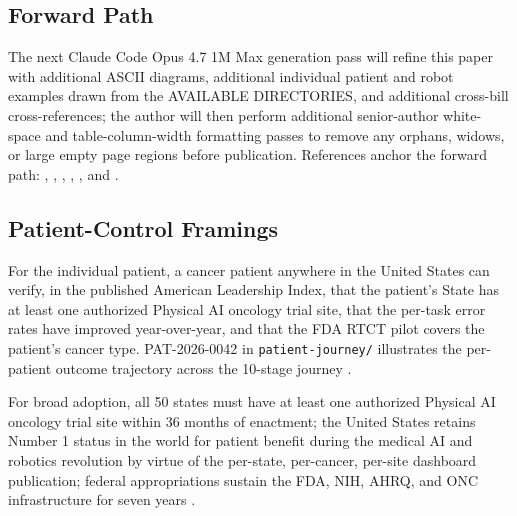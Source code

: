 \subsection{Forward Path}

\hspace{0.5cm} The next Claude Code Opus 4.7 1M Max generation pass will refine
this paper with additional ASCII diagrams, additional individual
patient and robot examples drawn from the AVAILABLE DIRECTORIES, and
additional cross-bill cross-references; the author will then
perform additional senior-author white-space and table-column-width
formatting passes to remove any orphans, widows, or large empty
page regions before publication. References anchor the forward
path: \cite{kawchak_2026_20045457}, \cite{fda_rtct_press_2026},
\cite{kawchak_2026_19994945}, \cite{kawchak_2026_19396256},
\cite{kawchak_2026_19244918}, and \cite{kawchak_2026_18810541}.

\subsection{Patient-Control Framings}

\hspace{0.5cm} For the individual patient, a cancer patient anywhere in the
United States can verify, in the published American Leadership
Index, that the patient's State has at least one authorized
Physical AI oncology trial site, that the per-task error rates have
improved year-over-year, and that the FDA RTCT pilot covers the
patient's cancer type. PAT-2026-0042 in \texttt{patient-journey/}
illustrates the per-patient outcome trajectory across the 10-stage
journey \cite{kawchak_2026_19119939}.

For broad adoption, all 50 states must have at least one authorized
Physical AI oncology trial site within 36 months of enactment; the
United States retains Number 1 status in the world for patient
benefit during the medical AI and robotics revolution by virtue of
the per-state, per-cancer, per-site dashboard publication; federal
appropriations sustain the FDA, NIH, AHRQ, and ONC infrastructure
for seven years \cite{kawchak_2026_19244918, kawchak_2026_19994945,
kawchak_2026_19396256}.
